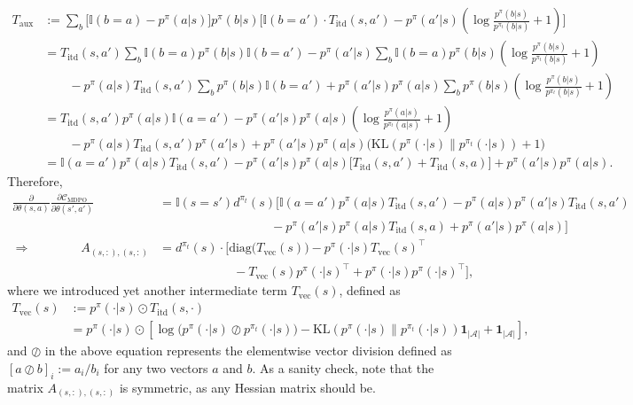 \documentclass[a4paper, 10pt]{article}
\begin{document}
\begin{align}
  T_{\text{aux}} &:= \sum_b \Big[ \mathbb{I}(b = a) - p^\pi(a | s) \Big] p^\pi(b | s) \Bigg[ \mathbb{I}(b = a') \cdot T_{\text{itd}}(s, a') - p^\pi(a' | s) \left( \log \frac{p^\pi(b | s)}{p^{\pi_t}(b | s)} + 1 \right) \Bigg] \\
  &= T_{\text{itd}}(s, a') \sum_{b} \mathbb{I}(b = a) p^\pi(b | s) \mathbb{I}(b = a') - p^\pi(a' | s) \sum_{b} \mathbb{I}(b = a) p^\pi(b | s) \left( \log \frac{p^\pi(b | s)}{p^{\pi_t}(b | s)} + 1 \right) \nonumber \\
  & \qquad - p^\pi(a | s) T_{\text{itd}}(s, a') \sum_{b} p^\pi(b | s) \mathbb{I}(b = a') + p^\pi(a' | s) p^\pi(a | s) \sum_{b} p^\pi(b | s) \left( \log \frac{p^\pi(b | s)}{p^{\pi_t}(b | s)} + 1 \right) \nonumber \\  
  &= T_{\text{itd}}(s, a') p^\pi(a | s) \mathbb{I}(a = a') - p^\pi(a' | s) p^\pi(a | s) \left( \log \frac{p^\pi(a | s)}{p^{\pi_t}(a | s)} + 1 \right) \nonumber \\
  & \qquad - p^\pi(a | s) T_{\text{itd}}(s, a') p^\pi(a' | s) + p^\pi(a' | s) p^\pi(a | s) \Big( \text{KL}( p^\pi(\cdot | s) \| p^{\pi_t}(\cdot | s) ) + 1 \Big) \nonumber \\
  &= \mathbb{I}(a = a') p^\pi(a | s) T_{\text{itd}}(s, a') - p^\pi(a' | s) p^\pi(a | s) \Big[ T_{\text{itd}}(s, a') + T_{\text{itd}}(s, a) \Big] + p^\pi(a' | s) p^\pi(a | s).
\end{align}
Therefore, 
\begin{align}
  \frac{\partial}{\partial \theta(s, a)} \frac{\partial \mathcal{C}_{\text{MDPO}}}{\partial \theta(s', a')} &= \mathbb{I}(s = s') d^{\pi_t}(s) \bigg[ \mathbb{I}(a = a') p^\pi(a | s) T_{\text{itd}}(s, a') - p^\pi(a | s) p^\pi(a' | s) T_{\text{itd}}(s, a') \nonumber \\
    & \qquad \qquad \qquad \qquad \quad - p^\pi(a' | s) p^\pi(a | s) T_{\text{itd}}(s, a) + p^\pi(a' | s) p^\pi(a | s) \bigg] \\
  \Rightarrow \qquad \qquad A_{(s, :), (s, :)} &= d^{\pi_t}(s) \cdot \Big[ \text{diag} \big( T_{\text{vec}}(s) \big) - p^{\pi}(\cdot | s) T_{\text{vec}}(s)^\top \nonumber \\
    & \qquad \qquad \qquad - T_{\text{vec}}(s) p^{\pi}(\cdot | s)^\top + p^{\pi}(\cdot | s) p^{\pi}(\cdot | s)^\top \Big],
\end{align}
where we introduced yet another intermediate term $T_{\text{vec}}(s)$, defined as
\begin{align}
  T_{\text{vec}}(s) &:= p^{\pi}(\cdot | s) \odot T_{\text{itd}}(s, \cdot) \\
  &= p^{\pi}(\cdot | s) \odot \left[ \log \Big( p^\pi(\cdot | s) \oslash p^{\pi_t}(\cdot | s) \Big) - \text{KL} (p^\pi(\cdot | s) \| p^{\pi_t}(\cdot | s)) \mathbf{1}_{|\mathcal{A}|} + \mathbf{1}_{|\mathcal{A}|} \right],
\end{align}
and $\oslash$ in the above equation represents the elementwise vector division defined as $[a \oslash b]_i := a_i / b_i$ for any two vectors $a$ and $b$. As a sanity check, note that the matrix $A_{(s, :), (s, :)}$ is symmetric, as any Hessian matrix should be.
\end{document}
